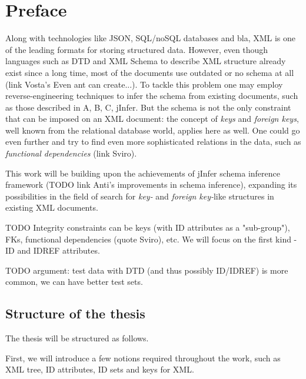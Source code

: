 \documentclass[a4paper,12pt,oneside]{report}
\theoremstyle{definition}
\let\openright=\clearpage
\def\chapwithtoc#1{
\chapter*{#1}
\addcontentsline{toc}{chapter}{#1}
}
\begin{document}
\newpage


\openright
\pagestyle{plain}
\setcounter{page}{1}
\tableofcontents

\newpage


\chapwithtoc{Preface}

Along with technologies like JSON, SQL/noSQL databases and bla, XML is one of the leading formats for storing structured data. However, even though languages such as DTD and XML Schema to describe XML structure already exist since a long time, most of the documents use outdated or no schema at all (link Vosta's Even ant can create...). To tackle this problem one may employ reverse-engineering techniques to infer the schema from existing documents, such as those described in A, B, C, jInfer. But the schema is not the only constraint that can be imposed on an XML document: the concept of \textit{keys} and \textit{foreign keys}, well known from the relational database world, applies here as well. One could go even further and try to find even more sophisticated relations in the data, such as \textit{functional dependencies} (link Sviro).

This work will be building upon the achievements of jInfer schema inference framework (TODO link Anti's improvements in schema inference), expanding its possibilities in the field of search for \textit{key-} and \textit{foreign key-}like structures in existing XML documents.

TODO Integrity constraints can be keys (with ID attributes as a "sub-group"), FKs, functional dependencies (quote Sviro), etc.
We will focus on the first kind - ID and IDREF attributes.

TODO argument: test data with DTD (and thus possibly ID/IDREF) is more common, we can have better test sets.

\section{Structure of the thesis}

The thesis will be structured as follows. 

First, we will introduce a few notions required throughout the work, such as XML tree, ID attributes, ID sets and keys for XML. 
\end{document}
